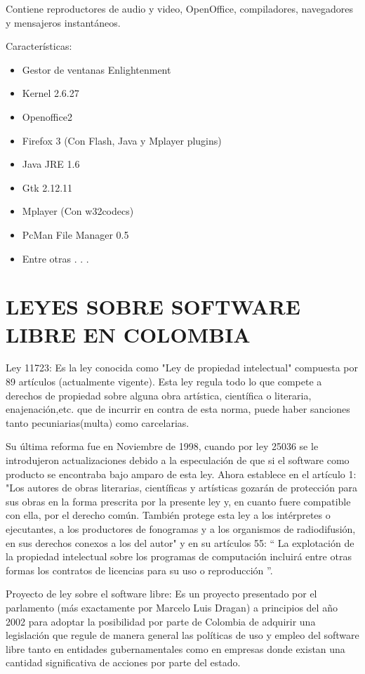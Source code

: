 Contiene reproductores de audio y video, OpenOffice,
compiladores, navegadores y mensajeros instantáneos.

Características:

\begin{itemize}
  \item Gestor de ventanas Enlightenment
  \item Kernel 2.6.27
  \item Openoffice2
  \item Firefox 3 (Con Flash, Java y Mplayer plugins)
  \item Java JRE 1.6
  \item Gtk 2.12.11
  \item Mplayer (Con w32codecs)
  \item PcMan File Manager 0.5
  \item Entre otras . . .
\end{itemize}

\section*{LEYES SOBRE SOFTWARE LIBRE EN COLOMBIA}

Ley 11723: Es la ley conocida como "Ley de propiedad
intelectual" compuesta por 89 artículos (actualmente vigente).
Esta ley regula todo lo que compete a derechos de propiedad
sobre alguna obra artística, científica o literaria,
enajenación,etc. que de incurrir en contra de esta norma, puede
haber sanciones tanto pecuniarias(multa) como carcelarias.

Su última reforma fue en Noviembre de 1998, cuando por ley
25036 se le introdujeron actualizaciones debido a la
especulación de que si el software como producto se encontraba
bajo amparo de esta ley. Ahora establece en el artículo 1: "Los
autores de obras literarias, científicas y artísticas gozarán de
protección para sus obras en la forma prescrita por la presente
ley y, en cuanto fuere compatible con ella, por el derecho común.
También protege esta ley a los intérpretes o ejecutantes, a los
productores de fonogramas y a los organismos de radiodifusión,
en sus derechos conexos a los del autor" y en su artículos 55: “
La explotación de la propiedad intelectual sobre los programas
de computación incluirá entre otras formas los contratos de
licencias para su uso o reproducción ”.

Proyecto de ley sobre el software libre: Es un proyecto
presentado por el parlamento (más exactamente por Marcelo
Luis Dragan) a principios del año 2002 para adoptar la
posibilidad por parte de Colombia de adquirir una legislación
que regule de manera general las políticas de uso y empleo del
software libre tanto en entidades gubernamentales como en
empresas donde existan una cantidad significativa de acciones
por parte del estado.

